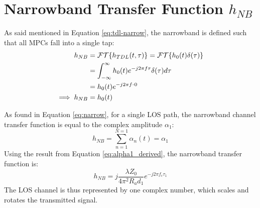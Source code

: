 \section{Narrowband Transfer Function $h_{NB}$}
As said mentioned in Equation \ref{eq:tdl-narrow}, the narrowband is defined such that all MPCs fall into a single tap:
\begin{align}
	h_{NB} &= \mathcal{FT}\{ h_{TDL}(t, \tau)\} = \mathcal{FT}\{ h_{0}(t)\delta(\tau)\} \\
	&= \int_{-\infty}^{\infty} h_0(t) e^{-j2\pi f \tau} \delta(\tau) d\tau \\
	&=h_0(t)e^{-j2\pi f \cdot \hspace{0.05em} 0} \\
	\implies h_{NB} &= h_0(t)
\end{align}

As found in Equation \ref{eq:narrow}, for a single LOS path, the narrowband channel transfer function is equal to the complex amplitude $\alpha_1$:
\begin{equation}
	h_{NB} = \sum_{n=1}^{N=1} \alpha_n(t) = \alpha_1
\end{equation}
Using the result from Equation \ref{eq:alpha1_derived}, the narrowband transfer function is:
\begin{equation}
	\boxed{h_{NB} = j \frac{\lambda Z_0}{4\pi^2 R_a d_1} e^{-j2\pi f_c \tau_1}}
	\label{eq:los_narrowband_tf_detailed}
\end{equation}
The LOS channel is thus represented by one complex number, which scales and rotates the transmitted signal.

